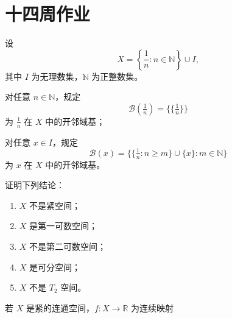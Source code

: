 \section{十四周作业}
\begin{homework}[13]
设
\[
X=\left\{\frac{1}{n}:n\in\mathbb{N}\right\}\cup I,
\]
其中 $I$ 为无理数集，$\mathbb{N}$ 为正整数集。

对任意 $n\in\mathbb{N}$，规定
\[
\mathcal{B}\!\left(\tfrac{1}{n}\right)=\bigl\{\{\tfrac{1}{n}\}\bigr\}
\]
为 $\tfrac{1}{n}$ 在 $X$ 中的开邻域基；

对任意 $x\in I$，规定
\[
\mathcal{B}(x)
=
\bigl\{\{\tfrac{1}{n}:n\ge m\}\cup\{x\}:m\in\mathbb{N}\bigr\}
\]
为 $x$ 在 $X$ 中的开邻域基。

证明下列结论：
\begin{enumerate}
  \item $X$ 不是紧空间；
  \item $X$ 是第一可数空间；
  \item $X$ 不是第二可数空间；
  \item $X$ 是可分空间；
  \item $X$ 不是 $T_2$ 空间。
\end{enumerate}
\end{homework}
\begin{homework}[14]
若 $X$ 是紧的连通空间，$f:X\to\mathbb{R}$ 为连续映射
\end{homework}
